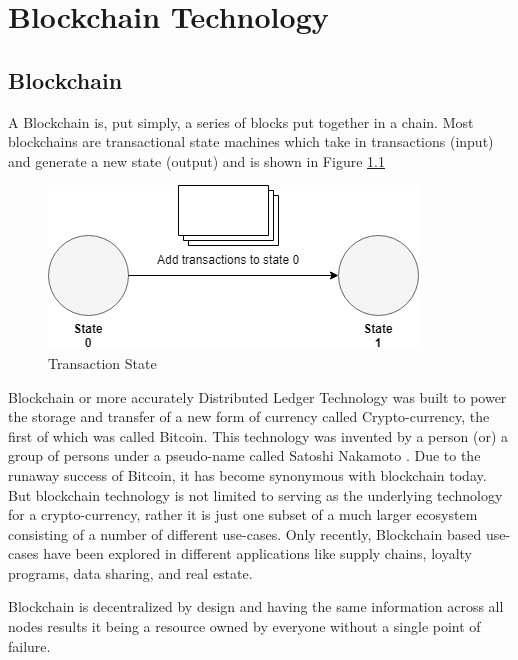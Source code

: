 \documentclass[11pt,openright]{report}
\begin{document}
\chapter{Blockchain Technology}
\label{chapter:blockchain_tech}
\section{Blockchain}
A Blockchain is, put simply, a series of blocks put together in a chain. Most blockchains are transactional state machines which take in transactions (input) and generate a new state (output) and is shown in Figure \ref{fig:State Change Diagram}
\newline
\newline
\begin{figure}[!htbp]
    \centering
    \includegraphics[scale=0.5]{images/statemachine.png}
    \caption{Transaction State}
    \label{fig:State Change Diagram}
\end{figure}
\newline
\newline
Blockchain or more accurately Distributed Ledger Technology was built to power the storage and transfer of a new form of currency called Crypto-currency, the first of which was called Bitcoin. This technology was invented by a person (or) a group of persons under a pseudo-name called Satoshi Nakamoto \cite{nakamoto2012bitcoin}. Due to the runaway success of Bitcoin, it has become synonymous with blockchain today. But blockchain technology is not limited to serving as the underlying technology for a crypto-currency, rather it is just one subset of a much larger ecosystem consisting of a number of different use-cases. Only recently, Blockchain based use-cases have been explored in different applications like supply chains, loyalty programs, data sharing, and real estate.

Blockchain is decentralized by design \cite{gencer2018decentralization} and having the same information across all nodes results it being a resource owned by everyone without a single point of failure. 
\end{document}
